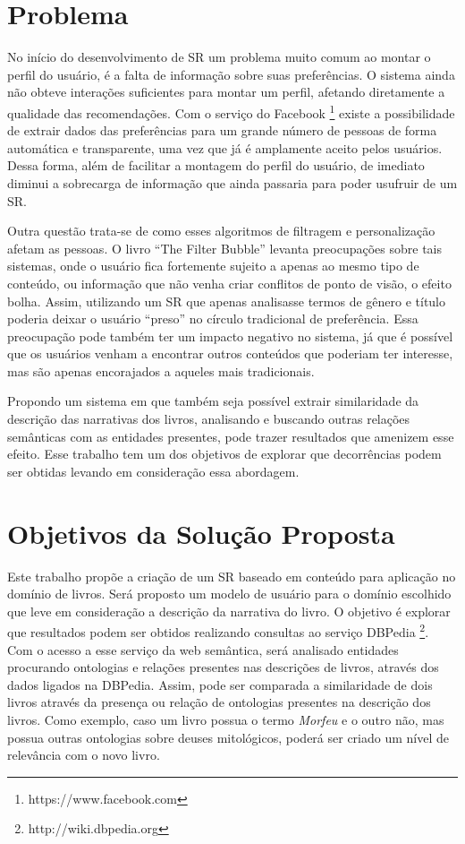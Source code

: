 \section{Problema}
No início do desenvolvimento de SR um problema muito comum ao montar o perfil do usuário, é a falta de informação sobre suas preferências. O sistema ainda não obteve interações suficientes para montar um perfil, afetando diretamente a qualidade das recomendações. Com o serviço do Facebook \footnote{https://www.facebook.com} existe a possibilidade de extrair dados das preferências para um grande número de pessoas de forma automática e transparente, uma vez que já é amplamente aceito pelos usuários. Dessa forma, além de facilitar a montagem do perfil do usuário, de imediato diminui a sobrecarga de informação que ainda passaria para poder usufruir de um SR.

Outra questão trata-se de como esses algoritmos de filtragem e personalização afetam as pessoas. O livro “The Filter Bubble” \cite{Pariser:2011} levanta preocupações sobre tais sistemas, onde o usuário fica fortemente sujeito a apenas ao mesmo tipo de conteúdo, ou informação que não venha criar conflitos de ponto de visão, o efeito bolha. Assim, utilizando um SR que apenas analisasse termos de gênero e título poderia deixar o usuário “preso” no círculo tradicional de preferência. Essa preocupação pode também ter um impacto negativo no sistema, já que é possível que os usuários venham a encontrar outros conteúdos que poderiam ter interesse, mas são apenas encorajados a aqueles mais tradicionais. 

Propondo um sistema em que também seja possível extrair similaridade da descrição das narrativas dos livros, analisando e buscando outras relações semânticas com as entidades presentes, pode trazer resultados que amenizem esse efeito. Esse trabalho tem um dos objetivos de explorar que decorrências podem ser obtidas levando em consideração essa abordagem.

\section{Objetivos da Solução Proposta}

Este trabalho propõe a criação de um SR baseado em conteúdo para aplicação no domínio de livros. Será proposto um modelo de usuário para o domínio escolhido que leve em consideração a descrição da narrativa do livro. O objetivo é explorar que resultados podem ser obtidos realizando consultas ao serviço DBPedia \footnote{http://wiki.dbpedia.org}. Com o acesso a esse serviço da web semântica, será analisado entidades procurando ontologias e relações presentes nas descrições de livros, através dos dados ligados na DBPedia. Assim, pode ser comparada a similaridade de dois livros através da presença ou relação de ontologias presentes na descrição dos livros. Como exemplo, caso um livro possua o termo \textit{Morfeu} e o outro não, mas possua outras ontologias sobre deuses mitológicos, poderá ser criado um nível de relevância com o novo livro.

